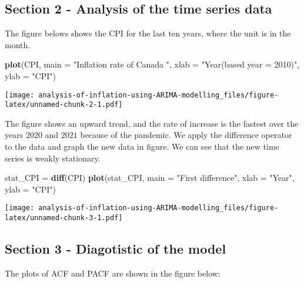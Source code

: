 \documentclass[
  12pt,
]{article}
\newenvironment{Shaded}{\begin{snugshade}}{\end{snugshade}}
\newcommand{\AttributeTok}[1]{\textcolor[rgb]{0.13,0.29,0.53}{#1}}
\newcommand{\FunctionTok}[1]{\textcolor[rgb]{0.13,0.29,0.53}{\textbf{#1}}}
\newcommand{\NormalTok}[1]{#1}
\newcommand{\OtherTok}[1]{\textcolor[rgb]{0.56,0.35,0.01}{#1}}
\newcommand{\StringTok}[1]{\textcolor[rgb]{0.31,0.60,0.02}{#1}}
\begin{document}
\hypertarget{section-2---analysis-of-the-time-series-data}{%
\subsection{Section 2 - Analysis of the time series
data}\label{section-2---analysis-of-the-time-series-data}}

The figure belows shows the CPI for the last ten years, where the unit
is in the month.

\begin{Shaded}
\begin{Highlighting}[]
\FunctionTok{plot}\NormalTok{(CPI, }\AttributeTok{main =} \StringTok{"Inflation rate of Canada  "}\NormalTok{, }\AttributeTok{xlab =} \StringTok{"Year(based year = 2010)"}\NormalTok{, }\AttributeTok{ylab =} \StringTok{"CPI"}\NormalTok{)}
\end{Highlighting}
\end{Shaded}

\texttt{[image: analysis-of-inflation-using-ARIMA-modelling\_files/figure-latex/unnamed-chunk-2-1.pdf]}

The figure shows an upward trend, and the rate of increase is the
fastest over the years \(2020\) and \(2021\) because of the pandemic. We
apply the difference operator to the data and graph the new data in
figure. We can see that the new time series is weakly stationary.

\begin{Shaded}
\begin{Highlighting}[]
\NormalTok{stat\_CPI }\OtherTok{=} \FunctionTok{diff}\NormalTok{(CPI)}
\FunctionTok{plot}\NormalTok{(stat\_CPI, }\AttributeTok{main =} \StringTok{"First difference"}\NormalTok{, }\AttributeTok{xlab =} \StringTok{"Year"}\NormalTok{, }\AttributeTok{ylab =} \StringTok{"CPI"}\NormalTok{)}
\end{Highlighting}
\end{Shaded}

\texttt{[image: analysis-of-inflation-using-ARIMA-modelling\_files/figure-latex/unnamed-chunk-3-1.pdf]}

\hypertarget{section-3---diagotistic-of-the-model}{%
\subsection{Section 3 - Diagotistic of the
model}\label{section-3---diagotistic-of-the-model}}

The plots of ACF and PACF are shown in the figure below:
\end{document}
